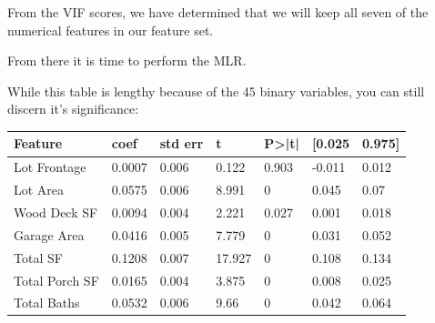\documentclass{article}
\begin{document}
	From the VIF scores, we have determined that we will keep all seven of the numerical features in our feature set. 

	From there it is time to perform the MLR.

	While this table is lengthy because of the 45 binary variables, you can still discern it's significance:

	\begin{table}[H]
		\centering
		\begin{tabular}{lllllll}
		\hline
		\multicolumn{1}{|l|}{Feature}    & \multicolumn{1}{l|}{coef} & \multicolumn{1}{l|}{std err} & \multicolumn{1}{l|}{t} & \multicolumn{1}{l|}{P\textgreater{}|t|} & \multicolumn{1}{l|}{{[}0.025} & \multicolumn{1}{l|}{0.975{]}} \\ \hline
		Lot Frontage                     & 0.0007                    & 0.006                        & 0.122                  & 0.903                                   & -0.011                        & 0.012                         \\
		Lot Area                         & 0.0575                    & 0.006                        & 8.991                  & 0                                       & 0.045                         & 0.07                          \\
		Wood Deck SF                     & 0.0094                    & 0.004                        & 2.221                  & 0.027                                   & 0.001                         & 0.018                         \\
		Garage Area                      & 0.0416                    & 0.005                        & 7.779                  & 0                                       & 0.031                         & 0.052                         \\
		Total SF                         & 0.1208                    & 0.007                        & 17.927                 & 0                                       & 0.108                         & 0.134                         \\
		Total Porch SF                   & 0.0165                    & 0.004                        & 3.875                  & 0                                       & 0.008                         & 0.025                         \\
		Total Baths                      & 0.0532                    & 0.006                        & 9.66                   & 0                                       & 0.042                         & 0.064                         \\

\end{tabular}
\end{table}
\end{document}
